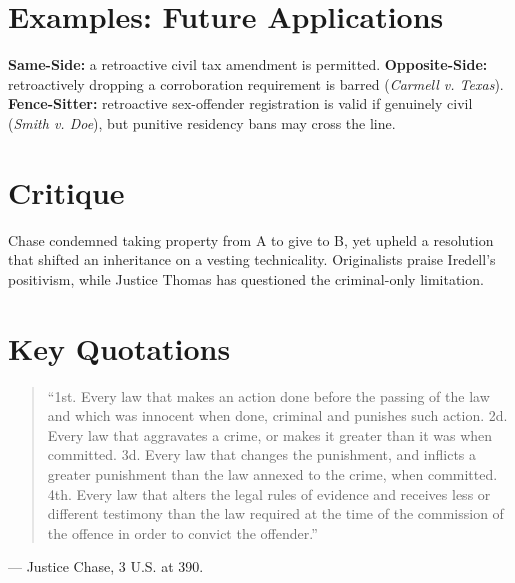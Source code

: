 \documentclass[12pt]{article}
\begin{document}
\section{Examples: Future Applications}
\textbf{Same-Side:} a retroactive civil tax amendment is permitted. \textbf{Opposite-Side:} retroactively dropping a corroboration requirement is barred (\textit{Carmell v. Texas}). \textbf{Fence-Sitter:} retroactive sex-offender registration is valid if genuinely civil (\textit{Smith v. Doe}), but punitive residency bans may cross the line.

\section{Critique}
Chase condemned taking property from A to give to B, yet upheld a resolution that shifted an inheritance on a vesting technicality. Originalists praise Iredell's positivism, while Justice Thomas has questioned the criminal-only limitation.

\section{Key Quotations}
\begin{quote}
``1st. Every law that makes an action done before the passing of the law and which was innocent when done, criminal and punishes such action. 2d. Every law that aggravates a crime, or makes it greater than it was when committed. 3d. Every law that changes the punishment, and inflicts a greater punishment than the law annexed to the crime, when committed. 4th. Every law that alters the legal rules of evidence and receives less or different testimony than the law required at the time of the commission of the offence in order to convict the offender.''
\end{quote}
\noindent --- Justice Chase, 3 U.S. at 390.
\end{document}
